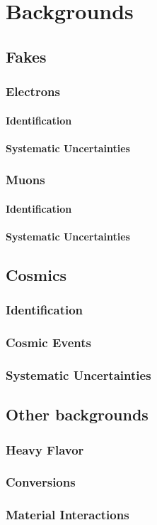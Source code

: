 \chapter{Backgrounds}

\section{Fakes}
\subsection{Electrons}
\subsubsection{Identification}
\subsubsection{Systematic Uncertainties}

\subsection{Muons}
\subsubsection{Identification}
\subsubsection{Systematic Uncertainties}

\section{Cosmics}
\label{sec:cosmics}
\subsection{Identification}
\subsection{Cosmic Events}
\subsection{Systematic Uncertainties}

\section{Other backgrounds}
\subsection{Heavy Flavor}
\subsection{Conversions}
\subsection{Material Interactions}

